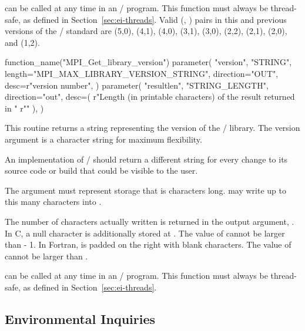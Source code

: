 can be called
at any time in an \MPI/ program.
This function must always be thread-safe, as defined in
Section~\ref{sec:ei-threads}.
Valid (, ) pairs in
this and previous versions of the \MPI/ standard
are (5,0), (4,1), (4,0), (3,1), (3,0), (2,2), (2,1), (2,0), and (1,2).

\begin{mpi-binding}
    function_name("MPI_Get_library_version")
    parameter(
        "version",
        "STRING",
        length="MPI_MAX_LIBRARY_VERSION_STRING",
        direction="OUT",
        desc=r"version number",
    )
    parameter(
        "resultlen",
        "STRING_LENGTH",
        direction="out",
        desc=(
            r"Length (in printable characters) of the result returned in "
            r""
        ),
    )
\end{mpi-binding}

This routine returns a string representing the version of the \MPI/ library. The version argument is a 
character string for maximum flexibility.

\begin{implementors}
An implementation of \MPI/ should return a different 
string for every change to its source code or build that could be visible 
to the user.
\end{implementors}

The argument  must represent storage that is\flushline %
 characters 
long.  may write up 
to this many characters into .

The number of characters actually written is returned in the 
output argument, . In C, a null character is 
additionally stored at . The value of 
 cannot be larger than 
 - 1. In 
Fortran,  is padded on the right with blank characters. 
The value of  cannot be larger than 
. 

 can be called
at any time in an \MPI/ program.
This function must always be thread-safe, as defined in
Section~\ref{sec:ei-threads}.

\subsection{Environmental Inquiries}
\label{subsec:inquiry-inquiry}

